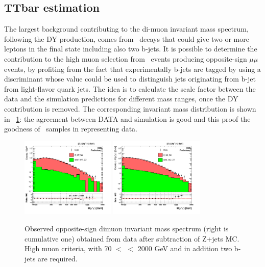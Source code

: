 \subsection{TTbar estimation}
The largest background contributing to the di-muon invariant mass spectrum, following the DY production, comes from \ttbar~decays that could give two or more leptons in the final state including also two b-jets. It is possible to determine the contribution to the high \pt muon selection from \ttbar~events producing opposite-sign $\mu\mu$ events, by profiting from the fact that experimentally b-jets are tagged by using a discriminant whose value could be used to distinguish jets originating from b-jet from light-flavor quark jets. The idea is to calculate the scale factor between the data and the simulation predictions for different mass ranges, once the DY contribution is removed. The corresponding invariant mass distribution is shown in \figurename~\ref{ttbar}: the agreement between DATA and simulation is good and this proof the goodness of \ttbar~samples in representing data.

\begin{figure}[htbp]
\centering
\includegraphics[width=0.4\textwidth]{Images/Cap5/TTbar-BTag-ICHEP16MCs-Data2016-mass-spectrum-MuMu-OS-37120pb_logx_after.png}
\includegraphics[width=0.4\textwidth]{Images/Cap5/TTbar-BTag-ICHEP16MCs-Data2016-cumulative-spectrum-MuMu-OS-37120pb_logx_after.png}
\caption{Observed opposite-sign dimuon invariant mass spectrum (right is cumulative one) obtained from data after subtraction of Z+jets MC. High \pt muon criteria, with 70 $<$ \Mmm $<$ 2000 GeV and in addition two b-jets are required.}
\label{ttbar}
\end{figure}

